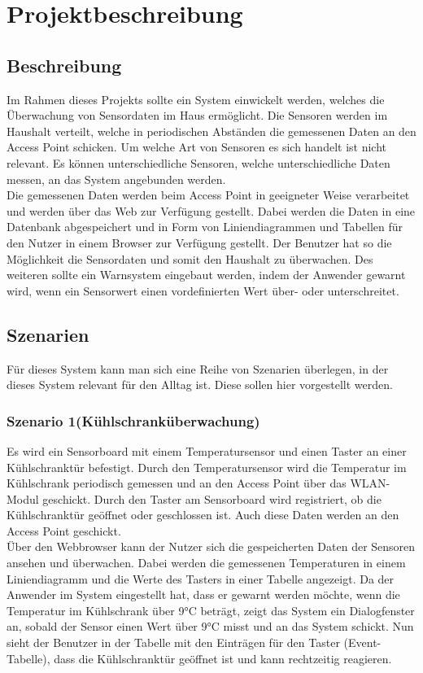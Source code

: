 \documentclass[12pt,a4paper,twoside]{article}
\newcommand{\labelSec}[1]{\label{sec:#1}}
\begin{document}
\section{Projektbeschreibung}\labelSec{abschnitt}

\subsection{Beschreibung}

Im Rahmen dieses Projekts sollte ein System einwickelt werden, welches die Überwachung von Sensordaten im Haus ermöglicht. Die Sensoren werden im Haushalt verteilt, welche in periodischen Abständen die gemessenen Daten an den Access Point schicken. Um welche Art von Sensoren es sich handelt ist nicht relevant. Es können unterschiedliche Sensoren, welche unterschiedliche Daten messen, an das System angebunden werden.\\
Die gemessenen Daten werden beim Access Point in geeigneter Weise verarbeitet und werden über das Web zur Verfügung gestellt. Dabei werden die Daten in eine Datenbank abgespeichert und in Form von Liniendiagrammen und Tabellen für den Nutzer in einem Browser zur Verfügung gestellt. Der Benutzer hat so die Möglichkeit die Sensordaten und somit den Haushalt zu überwachen.
Des weiteren sollte ein Warnsystem eingebaut werden, indem der Anwender gewarnt wird, wenn ein Sensorwert einen vordefinierten Wert über- oder unterschreitet. 

\subsection{Szenarien}
Für dieses System kann man sich eine Reihe von Szenarien überlegen, in der dieses System relevant für den Alltag ist. Diese sollen hier vorgestellt werden.

\subsubsection{Szenario 1(Kühlschranküberwachung)}
Es wird ein Sensorboard mit einem Temperatursensor und einen Taster an einer Kühlschranktür befestigt. Durch den Temperatursensor wird die Temperatur im Kühlschrank periodisch gemessen und an den Access Point über das WLAN-Modul geschickt. Durch den Taster am Sensorboard wird registriert, ob die Kühlschranktür geöffnet oder geschlossen ist. Auch diese Daten werden an den Access Point geschickt. \\
Über den Webbrowser kann der Nutzer sich die gespeicherten Daten der Sensoren ansehen und überwachen. Dabei werden die gemessenen Temperaturen in einem Liniendiagramm und die Werte des Tasters in einer Tabelle angezeigt. Da der Anwender im System eingestellt hat, dass er gewarnt werden möchte, wenn die Temperatur im Kühlschrank über 9°C beträgt, zeigt das System ein Dialogfenster an, sobald der Sensor einen Wert über 9°C misst und an das System schickt. Nun sieht der Benutzer in der Tabelle mit den Einträgen für den Taster (Event-Tabelle), dass die Kühlschranktür geöffnet ist und kann rechtzeitig reagieren.
\end{document}
